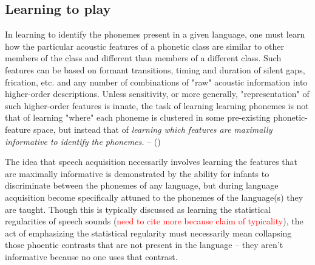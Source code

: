 \begin{multicols}{2}



\subsection{Learning to play}

In learning to identify the phonemes present in a given language, one must learn how the particular acoustic features of a phonetic class are similar to other members of the class and different than members of a different class. Such features can be based on formant transitions, timing and duration of silent gaps, frication, etc. and any number of combinations of "raw" acoustic information into higher-order descriptions. Unless sensitivity, or more generally, "representation" of such higher-order features is innate, the task of learning learning phonemes is not that of learning "where" each phoneme is clustered in some pre-existing phonetic-feature space, but instead that of \textit{learning which features are maximally informative to identify the phonemes.}\cite{kluenderLongstandingProblemsSpeech2019a} -- ()

The idea that speech acquisition necessarily involves learning the features that are maximally informative is demonstrated by the ability for infants to discriminate between the phonemes of any language, but during language acquisition become specifically attuned to the phonemes of the language(s) they are taught. Though this is typically discussed as learning the statistical regularities of speech  sounds (\textcolor{red}{need to cite more because claim of typicality}\cite{kuhlPhoneticLearningPathway2008}\cite{kuhlEarlyLanguageAcquisition2004}), the act of emphasizing the statistical regularity must necessarily mean collapsing those phoentic contrasts that are not present in the language -- they aren't informative because no one uses that contrast. 


\end{multicols}
